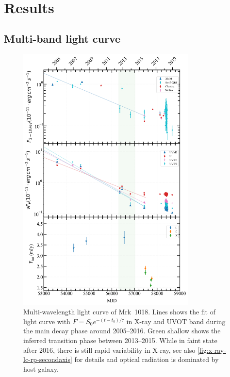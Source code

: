 \documentclass[twocolumn]{aastex63}
\begin{document}
\section{Results}
\label{sec:result}

\subsection{Multi-band light curve}

\begin{figure}
\centering
	\includegraphics[width=0.8\textwidth]{./pic/subplots-xrt_uvot-radio-second.png}
    \caption{Multi-wavelength light curve of Mrk~1018. Lines shows the fit of light curve with $F=S_0 e^{-(t-t_0)/\tau }$ in X-ray and UVOT band during the main decay phase around 2005--2016. Green shallow shows the inferred transition phase between 2013--2015.  While in faint state after 2016, there is still rapid variability in X-ray, see also \autoref{fig:x-ray-lc-rp-secondaxis} for details and optical radiation is dominated by host galaxy.}
    \label{fig:multi-lc-secondaxis}
\end{figure}
\end{document}
